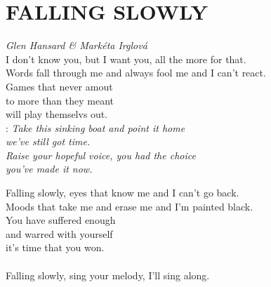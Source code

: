 \section*{\Huge FALLING SLOWLY}
\emph{Glen Hansard \& Markéta Irglová}\\

I don't know you, but I want you, all the more for that.\\
Words fall through me and always fool me and I can't react.\\

Games that never amout\\
to more than they meant\\
will play themselvs out.\\

\textregistered:
\emph{
Take this sinking boat and point it home\\
we've still got time.\\
Raise your hopeful voice, you had the choice\\
you've made it now.\\ 
}

Falling slowly, eyes that know me and I can't go back.\\
Moods that take me and erase me and I'm painted black.\\

You have suffered enough\\
and warred with yourself\\
it's time that you won.\\

\textregistered\\

Falling slowly, sing your melody, I'll sing along.

\newpage
